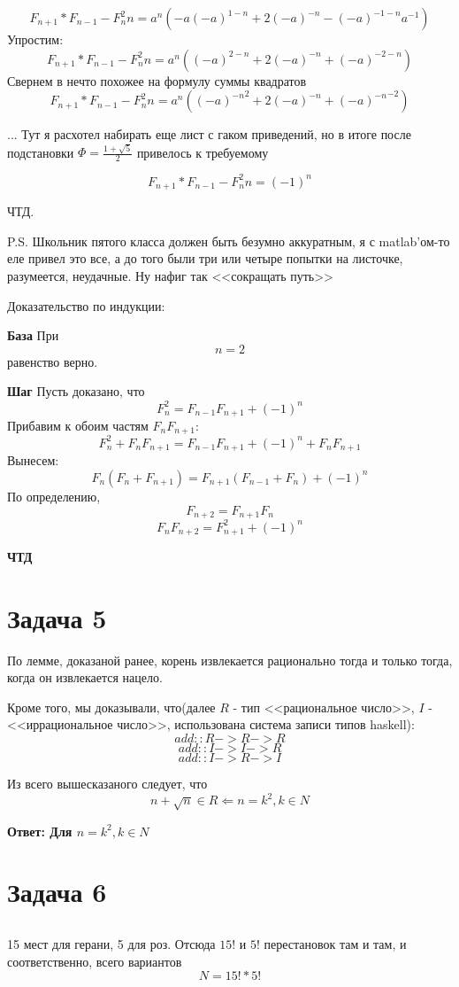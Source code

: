 \documentclass[11pt]{article}
\begin{document}
$$F_{n+1} * F_{n-1} - F_n^2n = a^n(-a(-a)^{1-n} + 2(-a) ^{-n} - (-a)^{-1-n}a^{-1})$$
Упростим:
$$F_{n+1} * F_{n-1} - F_n^2n = a^n((-a)^{2-n} + 2(-a) ^{-n} + (-a)^{-2-n})$$
Свернем в нечто похожее на формулу суммы квадратов
$$F_{n+1} * F_{n-1} - F_n^2n = a^n({(-a)^{-n}}^{2} + 2(-a)^{-n} + {(-a)^{-n}}^{-2})$$

... Тут я расхотел набирать еще лист с гаком приведений, но в итоге после подстановки $\Phi = \frac{1+\sqrt{5}}{2} $ привелось к требуемому

$$F_{n+1} * F_{n-1} - F_n^2n = (-1)^n$$

ЧТД.

P.S. Школьник пятого класса должен быть безумно аккуратным, я с matlab'ом-то еле привел это все, а до того были три или четыре попытки на листочке, разумеется, неудачные. Ну нафиг так <<сокращать путь>>


Доказательство по индукции: 

\textbf{База} При $$n=2$$ равенство верно. 

\textbf{Шаг} Пусть доказано, что 
$$F_n^2 = F_{n-1}F_{n+1} + (-1)^n$$ 
Прибавим к обоим частям $F_nF_{n+1}$:
$$F_n^2 +F_nF_{n+1}= F_{n-1}F_{n+1} + (-1)^n + F_nF_{n+1}$$ 
Вынесем:
$$F_n(F_n+F_{n+1})= F_{n+1}(F_{n-1}+F_n) + (-1)^n$$ 
По определению, $$F_{n+2} = F_{n+1}F_n$$
$$F_nF_{n+2} = F_{n+1}^2 + (-1)^n$$

\textbf{ЧТД}

\section{Задача 5}
По лемме, доказаной ранее, корень извлекается рационально тогда и только тогда,  когда он извлекается нацело.

Кроме того, мы доказывали, что(далее $R$ - тип <<рациональное число>>, $I$ - <<иррациональное число>>, использована система записи типов haskell):
$$add:: R -> R -> R$$
$$add:: I -> I -> R$$
$$add:: I -> R -> I$$

Из всего вышесказаного следует, что $$n+\sqrt{n} \in R \Leftarrow n = k^2, k\in N$$

\textbf{Ответ: Для $n=k^2, k \in N$}

\section{Задача 6}

\subsection{}
15 мест для герани, 5 для роз. Отсюда $15!$ и $5!$ перестановок там и там, и соответственно, всего вариантов  $$N=15!*5!$$ 
\end{document}

